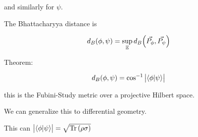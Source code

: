 and similarly for \(\psi\).

The Bhattacharyya distance is

\begin{equation}
  d_B (\phi, \psi) = \sup _\mathbb{E} d_B\qty(\vec{P_\phi}, \vec{P_\psi})
\end{equation}

Theorem:

\begin{equation}
  d_B (\phi, \psi) = \cos^{-1} \abs{\braket{\phi}{\psi}}
\end{equation}

this is the Fubini-Study metric over a projective Hilbert space.

We can generalize this to differential geometry.

This can
\(\abs{\braket{\phi}{\psi}} = \sqrt{\Tr \qty(\rho\sigma)}\)
